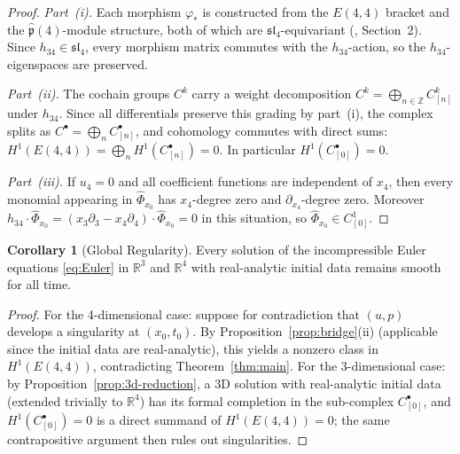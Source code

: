 \documentclass[reqno,10pt]{amsart}
\theoremstyle{definition}
\newtheorem{cor}[subsubsection]{Corollary}
\begin{document}
\begin{proof}
\textit{Part~(i).}
Each morphism $\varphi_*$ is constructed from the $E(4,4)$ bracket and the
$\hat{\mathfrak{p}}(4)$-module structure, both of which are
$\mathfrak{sl}_4$-equivariant (\cite{CCK2026}, Section~2).  Since
$h_{34}\in\mathfrak{sl}_4$, every morphism matrix commutes with the
$h_{34}$-action, so the $h_{34}$-eigenspaces are preserved.

\textit{Part~(ii).}
The cochain groups $C^k$ carry a weight decomposition
$C^k = \bigoplus_{n\in\mathbb{Z}} C^k_{[n]}$ under $h_{34}$.
Since all differentials preserve this grading by part~(i), the complex
splits as $C^\bullet = \bigoplus_n C^\bullet_{[n]}$, and cohomology
commutes with direct sums:
$H^1(E(4,4)) = \bigoplus_n H^1(C^\bullet_{[n]}) = 0$.
In particular $H^1(C^\bullet_{[0]}) = 0$.

\textit{Part~(iii).}
If $u_4=0$ and all coefficient functions are independent of $x_4$, then
every monomial appearing in $\widehat{\Phi}_{x_0}$ has $x_4$-degree zero
and $\partial_{x_4}$-degree zero.  Moreover
$h_{34}\cdot\widehat{\Phi}_{x_0} = (x_3\partial_3 - x_4\partial_4)\cdot
\widehat{\Phi}_{x_0} = 0$ in this situation, so
$\widehat{\Phi}_{x_0}\in C^1_{[0]}$.
\end{proof}

\begin{cor}[Global Regularity]\label{cor:regularity}
Every solution of the incompressible Euler equations
\eqref{eq:Euler} in $\mathbb{R}^3$ and $\mathbb{R}^4$ with real-analytic initial data
remains smooth for all time.
\end{cor}

\begin{proof}
For the 4-dimensional case: suppose for contradiction that $(u,p)$ develops
a singularity at $(x_0,t_0)$.  By Proposition~\ref{prop:bridge}(ii)
(applicable since the initial data are real-analytic),
this yields a nonzero class in $H^1(E(4,4))$, contradicting
Theorem~\ref{thm:main}.
For the 3-dimensional case: by Proposition~\ref{prop:3d-reduction}, a 3D
solution with real-analytic initial data (extended trivially to $\mathbb{R}^4$)
has its formal completion in the sub-complex $C^\bullet_{[0]}$, and
$H^1(C^\bullet_{[0]})=0$ is a direct summand of $H^1(E(4,4))=0$;
the same contrapositive argument then rules out singularities.
\end{proof}
\end{document}
